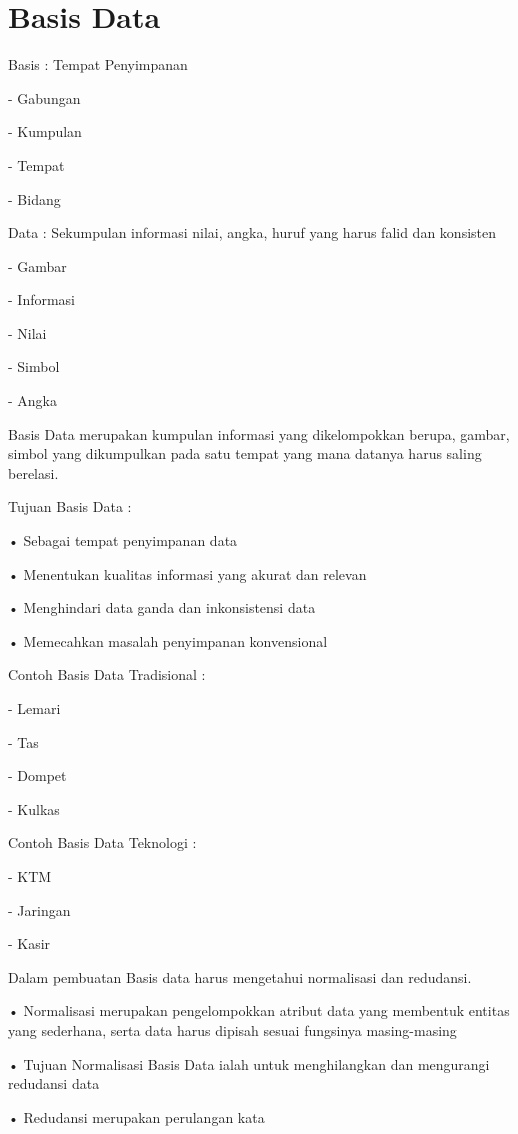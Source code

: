 \documentclass{article}
\begin{document}
\section{Basis Data}
Basis : Tempat Penyimpanan
\par - Gabungan
\par - Kumpulan
\par - Tempat
\par - Bidang
\vspace{0,5cm}
\par Data : Sekumpulan informasi nilai, angka, huruf yang harus falid dan konsisten
\par -	Gambar
\par -	Informasi
\par -	Nilai
\par -	Simbol
\par -	Angka
\vspace{0,5cm}
\par Basis Data merupakan kumpulan informasi yang dikelompokkan berupa, gambar, simbol yang dikumpulkan pada satu tempat yang mana datanya harus saling berelasi.
\vspace{0,5cm}
\par Tujuan Basis Data :
\par •	Sebagai tempat penyimpanan data
\par •	Menentukan kualitas informasi yang akurat dan relevan
\par •	Menghindari data ganda dan inkonsistensi data
\par •	Memecahkan masalah penyimpanan konvensional
\vspace{0,5cm}
\par Contoh Basis Data Tradisional :  
\par -	Lemari
\par -	Tas
\par -	Dompet
\par -	Kulkas
\newpage
\par Contoh Basis Data Teknologi :
\par -	KTM
\par -	Jaringan
\par -	Kasir
\vspace{0,5cm}
\par Dalam pembuatan Basis data harus mengetahui normalisasi dan redudansi.
\par •	Normalisasi merupakan pengelompokkan atribut data yang membentuk entitas yang sederhana, serta data harus dipisah sesuai fungsinya masing-masing 
\par •	Tujuan Normalisasi Basis Data ialah untuk menghilangkan dan mengurangi redudansi data
\par •	 Redudansi merupakan perulangan kata
\end{document}

